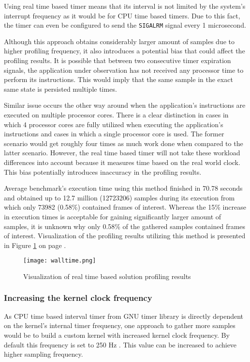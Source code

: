 \documentclass[..thesis.tex]{subfiles}
\begin{document}
Using real time based timer means that its interval is not limited by the system's interrupt frequency as it would be for CPU time based timers. Due to this fact, the timer can even be configured to send the \texttt{SIGALRM} signal every 1 microsecond.

Although this approach obtains considerably larger amount of samples due to higher profiling frequency, it also introduces a potential bias that could affect the profiling results. It is possible that between two consecutive timer expiration signals, the application under observation has not received any processor time to perform its instructions. This would imply that the same sample in the exact same state is persisted multiple times. 

Similar issue occurs the other way around when the application's instructions are executed on multiple processor cores. There is a clear distinction in cases in which 4 processor cores are fully utilized when executing the application's instructions and cases in which a single processor core is used. The former scenario would get roughly four times as much work done when compared to the latter scenario. However, the real time based timer will not take these workload differences into account because it measures time based on the real world clock. This bias potentially introduces inaccuracy in the profiling results.

Average benchmark's execution time using this method finished in 70.78 seconds and obtained up to 12.7 million (12723206) samples during its execution from which only 73982 (0.58\%) contained frames of interest. Whereas the 15\% increase in execution times is acceptable for gaining significantly larger amount of samples, it is unknown why only 0.58\% of the gathered samples contained frames of interest. Visualization of the profiling results utilizing this method is presented in Figure \ref{fig:walltime} on page \pageref{fig:walltime}.
\begin{figure}[H]
\texttt{[image: walltime.png]}
\caption{Visualization of real time based solution profiling results}
\label{fig:walltime}
\end{figure}

\subsubsection{Increasing the kernel clock frequency}
\label{kernel-clock}
As CPU time based interval timer from GNU timer library is directly dependent on the kernel's internal timer frequency, one approach to gather more samples would be to build a custom kernel with increased kernel clock frequency. By default this frequency is set to 250 Hz \cite{torvalds_linux:_2018}. This value can be increased to achieve higher sampling frequency. 
\end{document}
